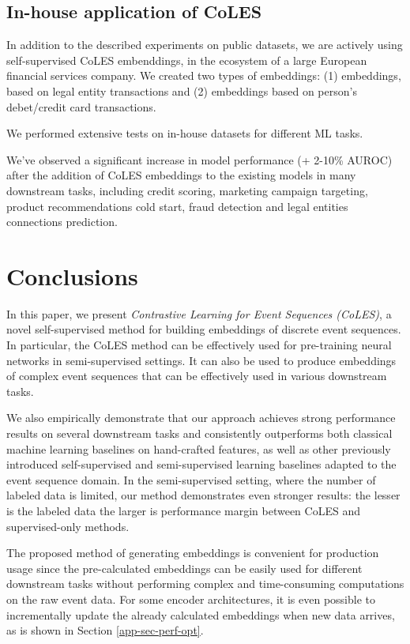 \documentclass[sigconf]{acmart}
\begin{document}
\subsection{In-house application of CoLES}

In addition to the described experiments on public datasets, we are actively using self-supervised CoLES embenddings, in the ecosystem of a large European financial services company. We created two types of embeddings: (1) embeddings, based on legal entity transactions and (2) embeddings based on person's debet/credit card transactions.

We performed extensive tests on in-house datasets for different ML tasks.

We've observed a significant increase in model performance (+ 2-10\% AUROC) after the addition of CoLES embeddings to the existing models in many downstream tasks, including credit scoring, marketing campaign targeting, product recommendations cold start, fraud detection and legal entities connections prediction.

\section{Conclusions} \label{sec-conclusions}

In this paper, we present \emph{Contrastive Learning for Event Sequences (CoLES)}, a novel self-supervised method for building embeddings of discrete event sequences.
In particular, the CoLES method can be effectively used for pre-training neural networks in semi-supervised settings. It can also be used to produce embeddings of complex event sequences that can be effectively used in various downstream tasks.

We also empirically demonstrate that our approach achieves strong performance results on several downstream tasks and consistently outperforms both classical machine learning baselines on hand-crafted features, as well as other  previously introduced  self-supervised and semi-supervised learning baselines adapted to the event sequence domain.
In the semi-supervised setting, where the number of labeled data is limited, our method demonstrates even stronger results: the lesser is the labeled data the larger is performance margin between CoLES and supervised-only methods.

The proposed method of generating embeddings is convenient for production usage since the pre-calculated embeddings can be easily used for different downstream tasks without performing complex and time-consuming computations on the raw event data.
For some encoder architectures, it is even possible to incrementally update the already calculated embeddings when new data arrives, as is shown in Section \ref{app-sec-perf-opt}.
\end{document}
